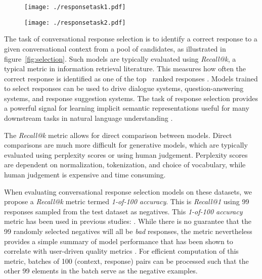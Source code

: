 \documentclass[11pt,a4paper,table]{article}
\begin{document}
\begin{figure*}[t]
    \centering
    \begin{subfigure}[t]{0.48\linewidth}
        \centering
        \texttt{[image: ./responsetask1.pdf]}
\label{fig:ex1}
    \end{subfigure}\hspace{1em}
    \begin{subfigure}[t]{0.48\textwidth}
        \centering
        \texttt{[image: ./responsetask2.pdf]}
\label{fig:ex2}
    \end{subfigure}
    \vspace{-2mm}
	\caption{Two examples illustrating the conversational response selection task: given the input context sentence, the goal is to identify the relevant response from a large pool of candidate responses.}
\vspace{-2.5mm}
\label{fig:selection}
\end{figure*}

The task of conversational response selection is to identify a correct response to a given conversational context from a pool of candidates, as illustrated in figure~\ref{fig:selection}. Such models are typically evaluated using \emph{Recall@k}, a typical metric in information retrieval literature. This measures how often the correct response is identified as one of the top~ ranked responses \cite{Lowe2015TheUD, inaba2016neural, yu2016strategy, AlRfou:2016arxiv, Henderson:2017arxiv, Lowe:2017dd, Wu:2017acl, Cer:2018arxiv, Chaudhuri:2018conll, Du:2018scai, Kumar2018, liu2018customized, Yang:2018repl, Zhou:2018acl, gunasekara2019dstc7, Tao:2019wsdm}.  Models trained to select responses can be used to drive dialogue systems, question-answering systems, and response suggestion systems. The task of response selection provides a powerful signal for learning implicit semantic representations useful for many downstream tasks in natural language understanding \cite{Cer:2018arxiv, Yang:2018repl}.


The \emph{Recall@k} metric allows for direct comparison between models. Direct comparisons are much more difficult for generative models, which are typically evaluated using perplexity scores or using human judgement. Perplexity scores are dependent on normalization, tokenization, and choice of vocabulary, while human judgement is expensive and time consuming.

When evaluating conversational response selection models on these datasets, we propose a \emph{Recall@k} metric termed \emph{1-of-100 accuracy}. This is \emph{Recall@1} using 99 responses sampled from the test dataset as negatives. This \emph{1-of-100 accuracy} metric has been used in previous studies: \cite{AlRfou:2016arxiv, Henderson:2017arxiv, Cer:2018arxiv, Kumar2018, Yang:2018repl, gunasekara2019dstc7}. While there is no guarantee that the 99 randomly selected negatives will all be \emph{bad} responses, the metric nevertheless provides a simple summary of model performance that has been shown to correlate with user-driven quality metrics \cite{Henderson:2017arxiv}. For efficient computation of this metric, batches of 100 (context, response) pairs can be processed such that the other 99 elements in the batch serve as the negative examples.
\end{document}
